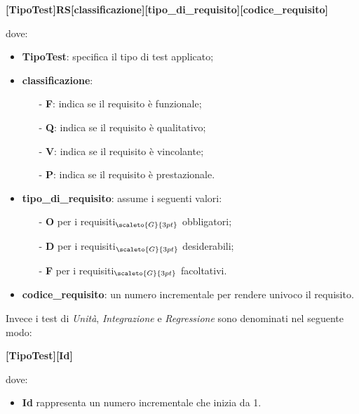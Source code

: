 \begin{center}
	\textbf{[TipoTest]RS[classificazione][tipo\_di\_requisito][codice\_requisito]}
\end{center}
dove:
\begin{itemize}
	\item \textbf{TipoTest}: specifica il tipo di test applicato;
	\item \textbf{classificazione}:
	\begin{itemize}
		\item[-] \textbf{F}: indica se il requisito è funzionale;
		\item[-] \textbf{Q}: indica se il requisito è qualitativo;
		\item[-] \textbf{V}: indica se il requisito è vincolante;
		\item[-] \textbf{P}: indica se il requisito è prestazionale.
	\end{itemize}
	\item \textbf{tipo\_di\_requisito}: assume i seguenti valori:
		\begin{itemize}
			\item[-] \textbf{O} per i requisiti$_{\scaleto{G}{3pt}}$ obbligatori;
			\item[-] \textbf{D} per i requisiti$_{\scaleto{G}{3pt}}$ desiderabili;
			\item[-] \textbf{F} per i requisiti$_{\scaleto{G}{3pt}}$ facoltativi.
		\end{itemize}
	\item \textbf{codice\_requisito}: un numero incrementale per rendere univoco il requisito.
\end{itemize}

Invece i test di \textit{Unità}, \textit{Integrazione} e \textit{Regressione} sono denominati nel seguente modo:
\begin{center}
	\textbf{[TipoTest][Id]}
\end{center}
dove:
\begin{itemize}
	\item \textbf{Id} rappresenta un numero incrementale che inizia da 1.
\end{itemize}

